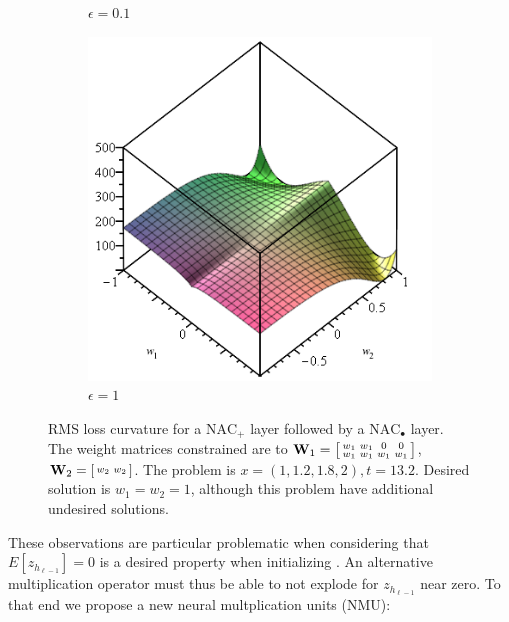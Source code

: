 \begin{figure}[H]
\begin{subfigure}{.33\textwidth}
  \caption{$\epsilon = 0.1$}
\end{subfigure}
\begin{subfigure}{.33\textwidth}
  \centering
  \includegraphics[width=\linewidth]{graphics/nac-mul-eps-1.png}
  \caption{$\epsilon = 1$}
\end{subfigure}
\caption{RMS loss curvature for a $\mathrm{NAC}_{+}$ layer followed by a $\mathrm{NAC}_{\bullet}$ layer. The weight matrices constrained are to $\mathbf{W}_1 = \left[\protect\begin{smallmatrix}
w_1 & w_1 & 0 & 0 \\
w_1 & w_1 & w_1 & w_1
\protect\end{smallmatrix}\right]$, $\mathbf{W}_2 = \left[\protect\begin{smallmatrix}
w_2 & w_2
\protect\end{smallmatrix}\right]$. The problem is $x = \left(1, 1.2, 1.8, 2\right), t = 13.2$. Desired solution is $w_1 = w_2 = 1$, although this problem have additional undesired solutions.}
\label{fig:nac-mul-eps-issue}
\end{figure}

These observations are particular problematic when considering that $E[z_{h_{\ell-1}}] = 0$ is a desired property when initializing \cite{glorot-initialization}. An alternative multiplication operator must thus be able to not explode for $z_{h_{\ell-1}}$ near zero. To that end we propose a new neural multplication units (NMU): 

